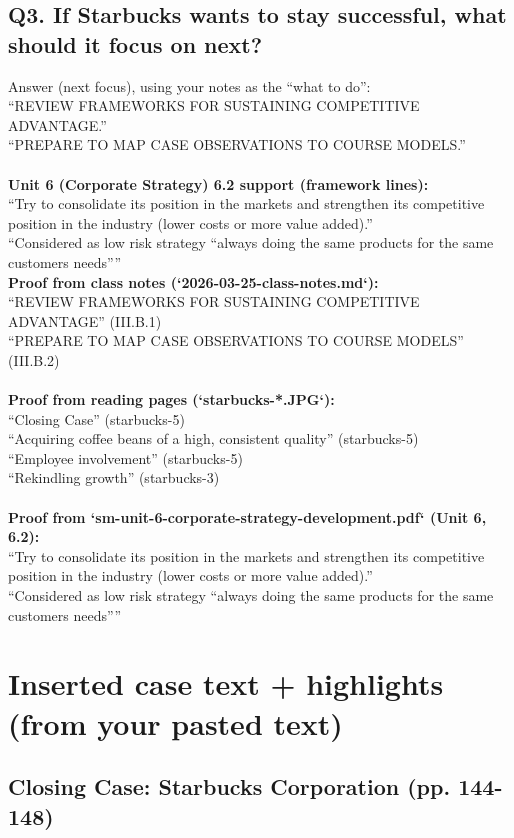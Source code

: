 \documentclass[10pt,a4paper]{article}
\begin{document}
\subsection*{\color{eublue}Q3. If Starbucks wants to stay successful, what should it focus on next?}
Answer (next focus), using your notes as the “what to do”:
\\
``REVIEW FRAMEWORKS FOR SUSTAINING COMPETITIVE ADVANTAGE.''
\\
``PREPARE TO MAP CASE OBSERVATIONS TO COURSE MODELS.''
\\
\\
\textbf{Unit 6 (Corporate Strategy) 6.2 support (framework lines):}
\\
``Try to consolidate its position in the markets and strengthen its competitive position in the industry (lower costs or more value added).''
\\
``Considered as low risk strategy “always doing the same products for the same customers needs”''
\\
\textbf{Proof from class notes (`2026-03-25-class-notes.md`):}
\\
``REVIEW FRAMEWORKS FOR SUSTAINING COMPETITIVE ADVANTAGE'' (III.B.1)
\\
``PREPARE TO MAP CASE OBSERVATIONS TO COURSE MODELS'' (III.B.2)
\\
\\
\textbf{Proof from reading pages (`starbucks-*.JPG`):}
\\
``Closing Case'' (starbucks-5)
\\
``Acquiring coffee beans of a high, consistent quality'' (starbucks-5)
\\
``Employee involvement'' (starbucks-5)
\\
``Rekindling growth'' (starbucks-3)
\\
\\
\textbf{Proof from `sm-unit-6-corporate-strategy-development.pdf` (Unit 6, 6.2):}
\\
``Try to consolidate its position in the markets and strengthen its competitive position in the industry (lower costs or more value added).''
\\
``Considered as low risk strategy “always doing the same products for the same customers needs”''

\section*{\color{eublue}Inserted case text + highlights (from your pasted text)}
\subsection*{\color{eublue}Closing Case: Starbucks Corporation (pp. 144-148)}
\end{document}
